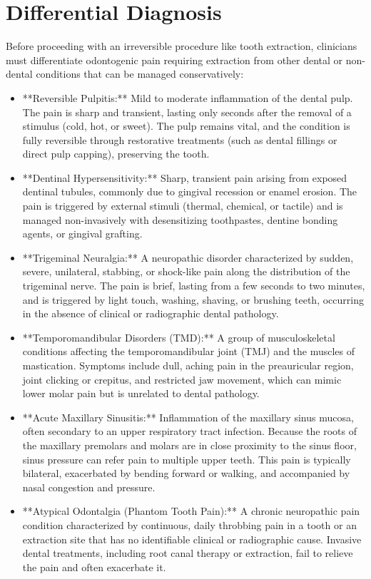 \section*{Differential Diagnosis}
Before proceeding with an irreversible procedure like tooth extraction, clinicians must differentiate odontogenic pain requiring extraction from other dental or non-dental conditions that can be managed conservatively:

\begin{itemize}
  \item **Reversible Pulpitis:** Mild to moderate inflammation of the dental pulp. The pain is sharp and transient, lasting only seconds after the removal of a stimulus (cold, hot, or sweet). The pulp remains vital, and the condition is fully reversible through restorative treatments (such as dental fillings or direct pulp capping), preserving the tooth.
  \item **Dentinal Hypersensitivity:** Sharp, transient pain arising from exposed dentinal tubules, commonly due to gingival recession or enamel erosion. The pain is triggered by external stimuli (thermal, chemical, or tactile) and is managed non-invasively with desensitizing toothpastes, dentine bonding agents, or gingival grafting.
  \item **Trigeminal Neuralgia:** A neuropathic disorder characterized by sudden, severe, unilateral, stabbing, or shock-like pain along the distribution of the trigeminal nerve. The pain is brief, lasting from a few seconds to two minutes, and is triggered by light touch, washing, shaving, or brushing teeth, occurring in the absence of clinical or radiographic dental pathology.
  \item **Temporomandibular Disorders (TMD):** A group of musculoskeletal conditions affecting the temporomandibular joint (TMJ) and the muscles of mastication. Symptoms include dull, aching pain in the preauricular region, joint clicking or crepitus, and restricted jaw movement, which can mimic lower molar pain but is unrelated to dental pathology.
  \item **Acute Maxillary Sinusitis:** Inflammation of the maxillary sinus mucosa, often secondary to an upper respiratory tract infection. Because the roots of the maxillary premolars and molars are in close proximity to the sinus floor, sinus pressure can refer pain to multiple upper teeth. This pain is typically bilateral, exacerbated by bending forward or walking, and accompanied by nasal congestion and pressure.
  \item **Atypical Odontalgia (Phantom Tooth Pain):** A chronic neuropathic pain condition characterized by continuous, daily throbbing pain in a tooth or an extraction site that has no identifiable clinical or radiographic cause. Invasive dental treatments, including root canal therapy or extraction, fail to relieve the pain and often exacerbate it.

\end{itemize}
